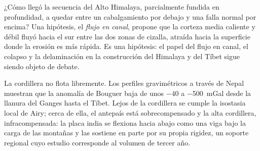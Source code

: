 \begin{omfigure}
\par{}
\end{omfigure}

¿Cómo llegó la secuencia del Alto Himalaya, parcialmente fundida en profundidad, a quedar entre un
cabalgamiento por debajo y una falla normal por encima? Una hipótesis, el \emph{flujo en canal}, propone que la corteza media caliente
y débil fluyó hacia el sur entre las dos zonas de cizalla, atraída hacia la
superficie donde la erosión es más rápida. Es una hipótesis: el papel del flujo en canal, el colapso
y la delaminación en la construcción del Himalaya y del Tíbet sigue siendo objeto de debate.

La cordillera no flota libremente. Los perfiles gravimétricos a través de Nepal muestran que la anomalía de Bouguer
baja de unos $-40$ a \qty{-500}{mGal} desde la llanura del Ganges hasta el Tíbet. Lejos de la
cordillera se cumple la isostasia local de Airy; cerca de ella, el antepaís está sobrecompensado y la alta
cordillera, infracompensada: la placa india se flexiona hacia abajo como una viga bajo la carga de las
montañas y las sostiene en parte por su propia rigidez, un soporte regional cuyo estudio
corresponde al volumen de tercer año.

